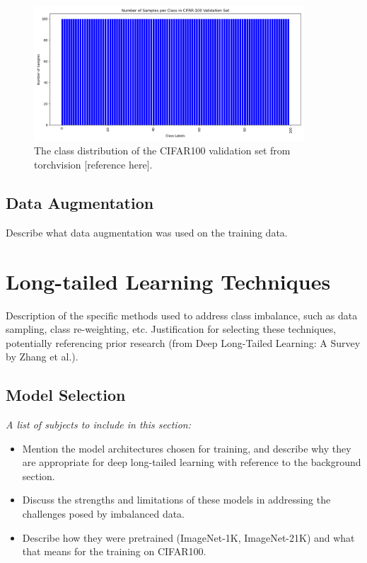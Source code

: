 \begin{figure}[H]
    \centering
    \includegraphics[width=0.9\textwidth]{Images/Plots/cifar100_val_class_distribution.png}
    \caption{The class distribution of the CIFAR100 validation set from torchvision [reference here].}
    \label{fig:cifar100val}
\end{figure}


\subsection{Data Augmentation}
Describe what data augmentation was used on the training data.

\section{Long-tailed Learning Techniques}
Description of the specific methods used to address class imbalance, such as data sampling, class re-weighting, etc. 
Justification for selecting these techniques, potentially referencing prior research (from Deep Long-Tailed Learning: A Survey by Zhang et al.).

\subsection{Model Selection}
\textit{A list of subjects to include in this section:}

\begin{itemize}
    \item Mention the model architectures chosen for training, and describe why they are appropriate for deep long-tailed learning with reference to the background section.
    \item Discuss the strengths and limitations of these models in addressing the challenges posed by imbalanced data.
    \item Describe how they were pretrained (ImageNet-1K, ImageNet-21K) and what that means for the training on CIFAR100.
\end{itemize}


